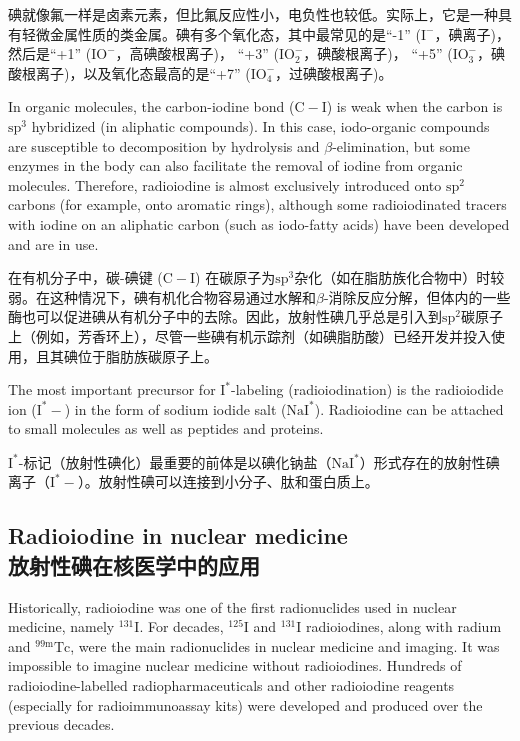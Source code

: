 \documentclass[dvipsnames, svgnames,a4paper,11pt]{article}
\begin{document}
碘就像氟一样是卤素元素，但比氟反应性小，电负性也较低。实际上，它是一种具有轻微金属性质的类金属。碘有多个氧化态，其中最常见的是“-1” (\(\mathrm{I^-}\)，碘离子)，然后是“+1” (\(\mathrm{IO^-}\)，高碘酸根离子)， “+3” (\(\mathrm{IO_2^-}\)，碘酸根离子)， “+5” (\(\mathrm{IO_3^-}\)，碘酸根离子)，以及氧化态最高的是“+7” (\(\mathrm{IO_4^-}\)，过碘酸根离子)。  


In organic molecules, the carbon-iodine bond (\(\mathrm{C-I}\)) is weak when the carbon is \(\mathrm{sp^3}\) hybridized (in aliphatic compounds). In this case, iodo-organic compounds are susceptible to decomposition by hydrolysis and \(\beta\)-elimination, but some enzymes in the body can also facilitate the removal of iodine from organic molecules. Therefore, radioiodine is almost exclusively introduced onto \(\mathrm{sp^2}\) carbons (for example, onto aromatic rings), although some radioiodinated tracers with iodine on an aliphatic carbon (such as iodo-fatty acids) have been developed and are in use.  

在有机分子中，碳-碘键 (\(\mathrm{C-I}\)) 在碳原子为\(\mathrm{sp^3}\)杂化（如在脂肪族化合物中）时较弱。在这种情况下，碘有机化合物容易通过水解和\(\beta\)-消除反应分解，但体内的一些酶也可以促进碘从有机分子中的去除。因此，放射性碘几乎总是引入到\(\mathrm{sp^2}\)碳原子上（例如，芳香环上），尽管一些碘有机示踪剂（如碘脂肪酸）已经开发并投入使用，且其碘位于脂肪族碳原子上。  


The most important precursor for \(\mathrm{I^*}\)-labeling (radioiodination) is the radioiodide ion (\(\mathrm{I^*-}\)) in the form of sodium iodide salt (\(\mathrm{NaI^*}\)). Radioiodine can be attached to small molecules as well as peptides and proteins.

\(\mathrm{I^*}\)-标记（放射性碘化）最重要的前体是以碘化钠盐（\(\mathrm{NaI^*}\)）形式存在的放射性碘离子（\(\mathrm{I^*-}\)）。放射性碘可以连接到小分子、肽和蛋白质上。


\subsection{Radioiodine in nuclear medicine\\ 放射性碘在核医学中的应用}  
Historically, radioiodine was one of the first radionuclides used in nuclear medicine, namely \(\mathrm{^{131}I}\). For decades, \(\mathrm{^{125}I}\) and \(\mathrm{^{131}I}\) radioiodines, along with radium and \(\mathrm{^{99m}Tc}\), were the main radionuclides in nuclear medicine and imaging. It was impossible to imagine nuclear medicine without radioiodines. Hundreds of radioiodine-labelled radiopharmaceuticals and other radioiodine reagents (especially for radioimmunoassay kits) were developed and produced over the previous decades.  
\end{document}
